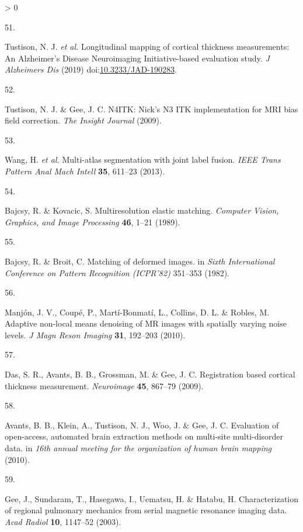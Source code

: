 \documentclass[
  12pt,
]{article}
\newlength{\cslhangindent}
\newlength{\csllabelwidth}
\newenvironment{CSLReferences}[3] %
 {%
  \setlength{\parindent}{0pt}
  \ifodd #1 \everypar{\setlength{\hangindent}{\cslhangindent}}\ignorespaces\fi
  \ifnum #2 > 0
  \setlength{\parskip}{#3\baselineskip}
  \fi
 }%
 {}
\newcommand{\CSLLeftMargin}[1]{\parbox[t]{\maxof{\widthof{#1}}{\csllabelwidth}}{#1}}
\newcommand{\CSLRightInline}[1]{\parbox[t]{\linewidth}{#1}}
\begin{document}
\begin{CSLReferences}{0}{0}
\leavevmode\hypertarget{ref-Tustison:2019aa}{}%
\CSLLeftMargin{51. }
\CSLRightInline{Tustison, N. J. \emph{et al.} Longitudinal mapping of
cortical thickness measurements: An {A}lzheimer's {D}isease
{N}euroimaging {I}nitiative-based evaluation study. \emph{J Alzheimers
Dis} (2019)
doi:\href{https://doi.org/10.3233/JAD-190283}{10.3233/JAD-190283}.}

\leavevmode\hypertarget{ref-Tustison2009e}{}%
\CSLLeftMargin{52. }
\CSLRightInline{Tustison, N. J. \& Gee, J. C. {N4ITK}: Nick's {N3} {ITK}
implementation for {MRI} bias field correction. \emph{The Insight
Journal} (2009).}

\leavevmode\hypertarget{ref-Wang:2013ab}{}%
\CSLLeftMargin{53. }
\CSLRightInline{Wang, H. \emph{et al.} Multi-atlas segmentation with
joint label fusion. \emph{IEEE Trans Pattern Anal Mach Intell}
\textbf{35}, 611--23 (2013).}

\leavevmode\hypertarget{ref-Bajcsy:1989aa}{}%
\CSLLeftMargin{54. }
\CSLRightInline{Bajcsy, R. \& Kovacic, S. Multiresolution elastic
matching. \emph{Computer Vision, Graphics, and Image Processing}
\textbf{46}, 1--21 (1989).}

\leavevmode\hypertarget{ref-Bajcsy:1982aa}{}%
\CSLLeftMargin{55. }
\CSLRightInline{Bajcsy, R. \& Broit, C. Matching of deformed images. in
\emph{{S}ixth {I}nternational {C}onference on {P}attern {R}ecognition
({ICPR}'82)} 351--353 (1982).}

\leavevmode\hypertarget{ref-Manjon:2010aa}{}%
\CSLLeftMargin{56. }
\CSLRightInline{Manjón, J. V., Coupé, P., Martí-Bonmatí, L., Collins, D.
L. \& Robles, M. Adaptive non-local means denoising of {MR} images with
spatially varying noise levels. \emph{J Magn Reson Imaging} \textbf{31},
192--203 (2010).}

\leavevmode\hypertarget{ref-Das:2009aa}{}%
\CSLLeftMargin{57. }
\CSLRightInline{Das, S. R., Avants, B. B., Grossman, M. \& Gee, J. C.
Registration based cortical thickness measurement. \emph{Neuroimage}
\textbf{45}, 867--79 (2009).}

\leavevmode\hypertarget{ref-Avants:2010ab}{}%
\CSLLeftMargin{58. }
\CSLRightInline{Avants, B. B., Klein, A., Tustison, N. J., Woo, J. \&
Gee, J. C. Evaluation of open-access, automated brain extraction methods
on multi-site multi-disorder data. in \emph{16th annual meeting for the
organization of human brain mapping} (2010).}

\leavevmode\hypertarget{ref-Gee:2003aa}{}%
\CSLLeftMargin{59. }
\CSLRightInline{Gee, J., Sundaram, T., Hasegawa, I., Uematsu, H. \&
Hatabu, H. Characterization of regional pulmonary mechanics from serial
magnetic resonance imaging data. \emph{Acad Radiol} \textbf{10},
1147--52 (2003).}


\end{CSLReferences}
\end{document}
